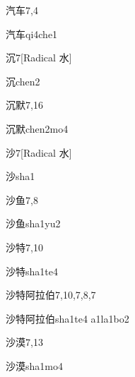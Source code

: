 \begin{entry}{汽车}{7,4}
  \begin{phonetics}{汽车}{qi4che1}
  \end{phonetics}
\end{entry}

\begin{entry}{沉}{7}[Radical 水]
  \begin{phonetics}{沉}{chen2}
  \end{phonetics}
\end{entry}

\begin{entry}{沉默}{7,16}
  \begin{phonetics}{沉默}{chen2mo4}
  \end{phonetics}
\end{entry}

\begin{entry}{沙}{7}[Radical 水]
  \begin{phonetics}{沙}{sha1}
  \end{phonetics}
\end{entry}

\begin{entry}{沙鱼}{7,8}
  \begin{phonetics}{沙鱼}{sha1yu2}
  \end{phonetics}
\end{entry}

\begin{entry}{沙特}{7,10}
  \begin{phonetics}{沙特}{sha1te4}
  \end{phonetics}
\end{entry}

\begin{entry}{沙特阿拉伯}{7,10,7,8,7}
  \begin{phonetics}{沙特阿拉伯}{sha1te4 a1la1bo2}
  \end{phonetics}
\end{entry}

\begin{entry}{沙漠}{7,13}
  \begin{phonetics}{沙漠}{sha1mo4}
  \end{phonetics}
\end{entry}

